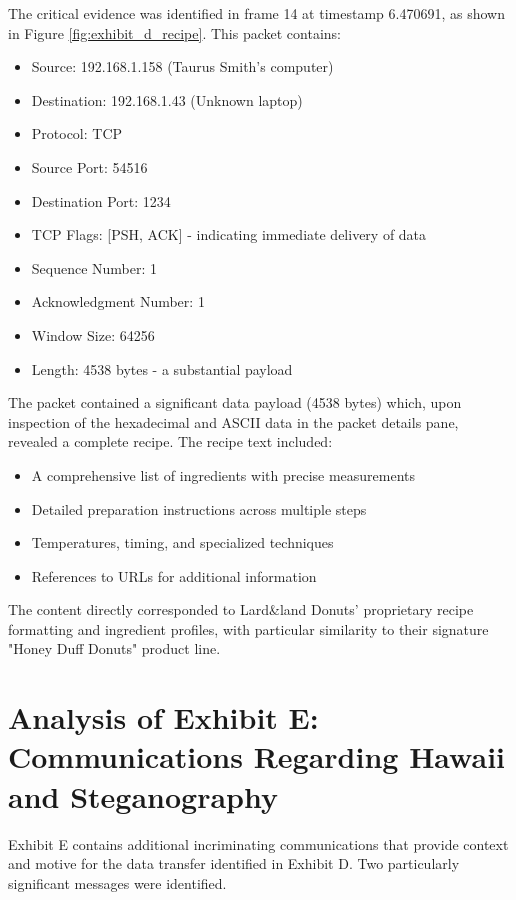 The critical evidence was identified in frame 14 at timestamp 6.470691, as shown in Figure \ref{fig:exhibit_d_recipe}. This packet contains:

\begin{itemize}
    \item Source: 192.168.1.158 (Taurus Smith's computer)
    \item Destination: 192.168.1.43 (Unknown laptop)
    \item Protocol: TCP
    \item Source Port: 54516
    \item Destination Port: 1234
    \item TCP Flags: [PSH, ACK] - indicating immediate delivery of data
    \item Sequence Number: 1
    \item Acknowledgment Number: 1
    \item Window Size: 64256
    \item Length: 4538 bytes - a substantial payload
\end{itemize}

The packet contained a significant data payload (4538 bytes) which, upon inspection of the hexadecimal and ASCII data in the packet details pane, revealed a complete recipe. The recipe text included:

\begin{itemize}
    \item A comprehensive list of ingredients with precise measurements
    \item Detailed preparation instructions across multiple steps
    \item Temperatures, timing, and specialized techniques
    \item References to URLs for additional information
\end{itemize}

The content directly corresponded to Lard\&land Donuts' proprietary recipe formatting and ingredient profiles, with particular similarity to their signature "Honey Duff Donuts" product line.

\section{Analysis of Exhibit E: Communications Regarding Hawaii and Steganography}

Exhibit E contains additional incriminating communications that provide context and motive for the data transfer identified in Exhibit D. Two particularly significant messages were identified.

